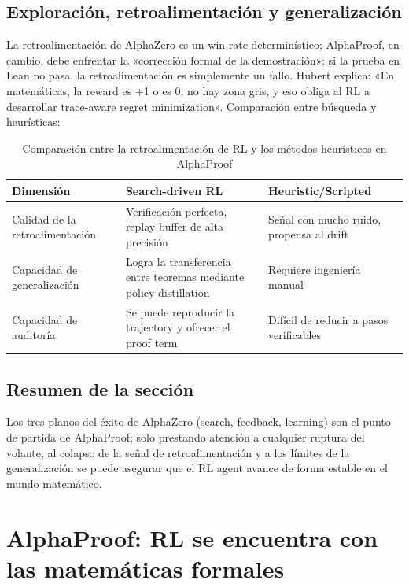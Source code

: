 \documentclass[a4paper]{article}
\begin{document}
\subsection{Exploración, retroalimentación y generalización}
La retroalimentación de AlphaZero es un win-rate determinístico; AlphaProof, en cambio, debe enfrentar la «corrección formal de la demostración»: si la prueba en Lean no pasa, la retroalimentación es simplemente un fallo. Hubert explica: «En matemáticas, la reward es +1 o es 0, no hay zona gris, y eso obliga al RL a desarrollar trace-aware regret minimization». Comparación entre búsqueda y heurísticas:
\begin{table}[H]
\centering
\begin{tabular}{p{4cm}p{4cm}p{4cm}}
\toprule
Dimensión & Search-driven RL & Heuristic/Scripted \\
\midrule
Calidad de la retroalimentación & Verificación perfecta, replay buffer de alta precisión & Señal con mucho ruido, propensa al drift \\
Capacidad de generalización & Logra la transferencia entre teoremas mediante policy distillation & Requiere ingeniería manual \\
Capacidad de auditoría & Se puede reproducir la trajectory y ofrecer el proof term & Difícil de reducir a pasos verificables \\
\bottomrule
\end{tabular}
\caption{Comparación entre la retroalimentación de RL y los métodos heurísticos en AlphaProof}
\end{table}

\subsection{Resumen de la sección}
Los tres planos del éxito de AlphaZero (search, feedback, learning) son el punto de partida de AlphaProof; solo prestando atención a cualquier ruptura del volante, al colapso de la señal de retroalimentación y a los límites de la generalización se puede asegurar que el RL agent avance de forma estable en el mundo matemático.
\newpage

\section{AlphaProof: RL se encuentra con las matemáticas formales}
\end{document}
